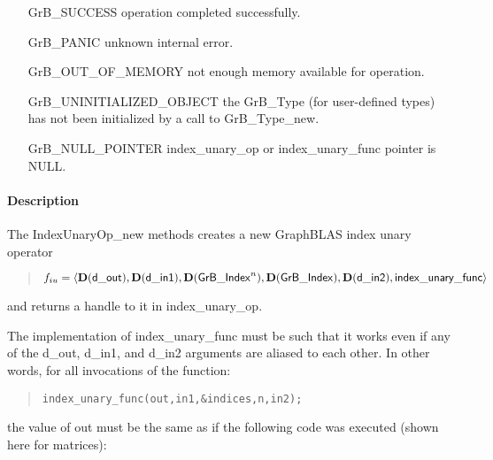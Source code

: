 \begin{itemize}[leftmargin=2.1in]
\item[{\sf GrB\_SUCCESS}]           operation completed successfully.
\item[{\sf GrB\_PANIC}]             unknown internal error.
\item[{\sf GrB\_OUT\_OF\_MEMORY}]          not enough memory available for operation.
\item[{\sf GrB\_UNINITIALIZED\_OBJECT}]          the {\sf GrB\_Type} (for user-defined types)
                                    has not been initialized by a call to {\sf GrB\_Type\_new}.
\item[{\sf GrB\_NULL\_POINTER}]    {\sf index\_unary\_op} or {\sf index\_unary\_func} pointer is {\sf NULL}.

\end{itemize}

\paragraph{Description}

The {\sf IndexUnaryOp\_new} methods creates a new GraphBLAS index unary operator
\begin{quote}
$f_{iu} = \langle \mathbf{D}({\sf d\_out}), \mathbf{D}({\sf d\_in1}), \mathbf{D}({\sf GrB\_Index}^n), \mathbf{D}({\sf GrB\_Index}), \mathbf{D}({\sf d\_in2}), {\sf index\_unary\_func} \rangle$
\end{quote}
and returns a handle to it in {\sf index\_unary\_op}.

The implementation of {\sf index\_unary\_func} must be such that it works
even if any of the {\sf d\_out}, {\sf d\_in1}, and {\sf d\_in2} arguments are aliased to each other.
In other words, for all invocations of the function:
\begin{quote}
\begin{verbatim}
index_unary_func(out,in1,&indices,n,in2);
\end{verbatim}
\end{quote}
the value of {\sf out} must be the same as if the following code
was executed (shown here for matrices):

